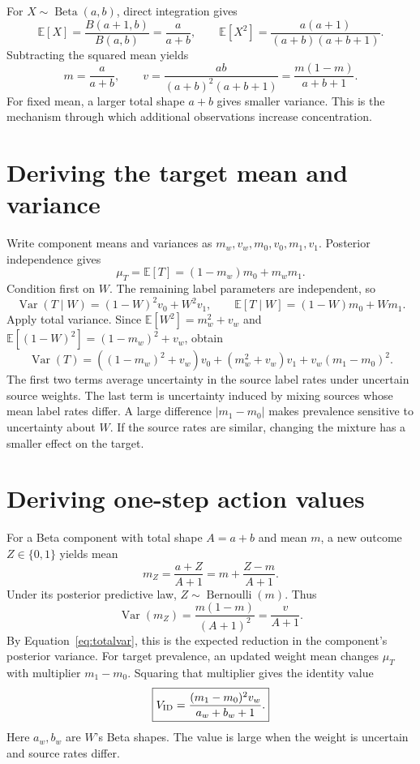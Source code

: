 \documentclass[11pt,a4paper]{report}
\newcommand{\E}{\mathbb E}
\newcommand{\Var}{\operatorname{Var}}
\newcommand{\Bern}{\operatorname{Bernoulli}}
\newcommand{\Beta}{\operatorname{Beta}}
\begin{document}
For $X\sim\Beta(a,b)$, direct integration gives
\begin{equation}
\E[X]=\frac{B(a+1,b)}{B(a,b)}=\frac a{a+b},\qquad
\E[X^2]=\frac{a(a+1)}{(a+b)(a+b+1)}.
\end{equation}
Subtracting the squared mean yields
\begin{equation}
m=\frac a{a+b},\qquad v=\frac{ab}{(a+b)^2(a+b+1)}
=\frac{m(1-m)}{a+b+1}.
\label{eq:betamoments}
\end{equation}
For fixed mean, a larger total shape $a+b$ gives smaller variance. This is the mechanism through which additional observations increase concentration.

\section{Deriving the target mean and variance}
Write component means and variances as $m_w,v_w,m_0,v_0,m_1,v_1$. Posterior independence gives
\begin{equation}
\mu_T=\E[T]=(1-m_w)m_0+m_wm_1.
\label{eq:tmean}
\end{equation}
Condition first on $W$. The remaining label parameters are independent, so
\begin{equation}
\Var(T\mid W)=(1-W)^2v_0+W^2v_1,
\qquad \E[T\mid W]=(1-W)m_0+Wm_1.
\end{equation}
Apply total variance. Since $\E[W^2]=m_w^2+v_w$ and $\E[(1-W)^2]=(1-m_w)^2+v_w$, obtain
\begin{equation}
\boxed{\Var(T)=((1-m_w)^2+v_w)v_0+(m_w^2+v_w)v_1
+v_w(m_1-m_0)^2.}
\label{eq:tvar}
\end{equation}
The first two terms average uncertainty in the source label rates under uncertain source weights. The last term is uncertainty induced by mixing sources whose mean label rates differ. A large difference $|m_1-m_0|$ makes prevalence sensitive to uncertainty about $W$. If the source rates are similar, changing the mixture has a smaller effect on the target.

\section{Deriving one-step action values}
For a Beta component with total shape $A=a+b$ and mean $m$, a new outcome $Z\in\{0,1\}$ yields mean
\begin{equation}
m_Z=\frac{a+Z}{A+1}=m+\frac{Z-m}{A+1}.
\end{equation}
Under its posterior predictive law, $Z\sim\Bern(m)$. Thus
\begin{equation}
\Var(m_Z)=\frac{m(1-m)}{(A+1)^2}=\frac v{A+1}.
\end{equation}
By Equation~\eqref{eq:totalvar}, this is the expected reduction in the component's posterior variance. For target prevalence, an updated weight mean changes $\mu_T$ with multiplier $m_1-m_0$. Squaring that multiplier gives the identity value
\begin{equation}
\boxed{V_{\rm ID}=\frac{(m_1-m_0)^2v_w}{a_w+b_w+1}.}
\label{eq:vid}
\end{equation}
Here $a_w,b_w$ are $W$'s Beta shapes. The value is large when the weight is uncertain and source rates differ.
\end{document}
